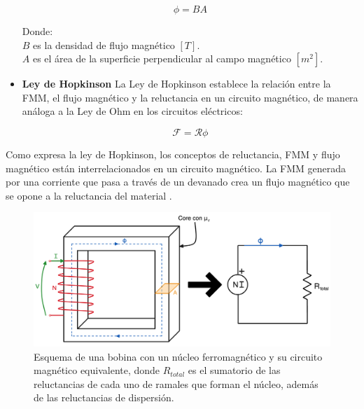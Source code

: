 \begin{itemize}
    \[\phi = BA\]
    
    Donde:\\
    \(B\) es la densidad de flujo magnético \([T]\).\\
    \(A\) es el área de la superficie perpendicular al campo magnético \([m^2]\).\\

    \item \textbf{Ley de Hopkinson}
    La Ley de Hopkinson establece la relación entre la FMM, el flujo magnético y la reluctancia en un circuito magnético, de manera análoga a la Ley de Ohm en los circuitos eléctricos:
    
    \[\mathcal{F}=\mathcal{R}\phi\]
\end{itemize}

Como expresa la ley de Hopkinson, los conceptos de reluctancia, FMM y flujo magnético están interrelacionados en un circuito magnético. La FMM generada por una corriente que pasa a través de un devanado crea un flujo magnético que se opone a la reluctancia del material \citep{griffiths2005}\citep{tipler2008}.

    \begin{figure}[H]
        \centering %
        \includegraphics[width=\textwidth]{FigurasMemoria/circuitoMagExplicacion.png}
        \caption{Esquema de una bobina con un núcleo ferromagnético y su circuito magnético equivalente, donde \(R_{total}\) es el sumatorio de las reluctancias de cada uno de ramales que forman el núcleo, además de las reluctancias de dispersión.}
        \label{fig:circuitoMagExplicacion} %
    \end{figure}